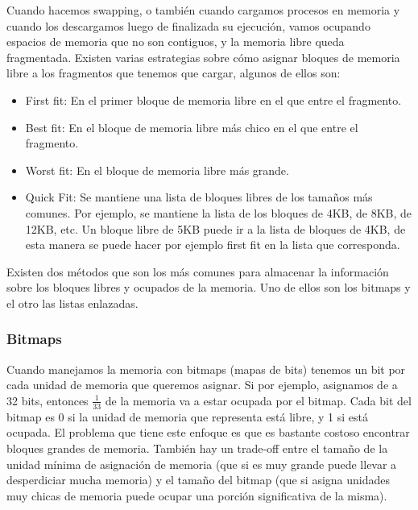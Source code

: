 \documentclass{article}
\begin{document}
Cuando hacemos swapping, o tambi\'en cuando cargamos procesos en memoria y cuando los descargamos luego de finalizada su ejecuci\'on, vamos ocupando espacios de memoria que no son contiguos, y la memoria libre queda fragmentada. Existen varias estrategias sobre c\'omo asignar bloques de memoria libre a los fragmentos que tenemos que cargar, algunos de ellos son:

\begin{itemize}
\item First fit: En el primer bloque de memoria libre en el que entre el fragmento.
\item Best fit: En el bloque de memoria libre m\'as chico en el que entre el fragmento.
\item Worst fit: En el bloque de memoria libre m\'as grande.
\item Quick Fit: Se mantiene una lista de bloques libres de los tama\~nos m\'as comunes. Por ejemplo, se mantiene la lista de los bloques de 4KB, de 8KB, de 12KB, etc. Un bloque libre de 5KB puede ir a la lista de bloques de 4KB, de esta manera se puede hacer por ejemplo first fit en la lista que corresponda.
\end{itemize}

Existen dos m\'etodos que son los m\'as comunes para almacenar la informaci\'on sobre los bloques libres y ocupados de la memoria. Uno de ellos son los bitmaps y el otro las listas enlazadas.

\subsubsection{Bitmaps}
Cuando manejamos la memoria con bitmaps (mapas de bits) tenemos un bit por cada unidad de memoria que queremos asignar. Si por ejemplo, asignamos de a 32 bits, entonces $\frac{1}{33}$ de la memoria va a estar ocupada por el bitmap. Cada bit del bitmap es 0 si la unidad de memoria que representa est\'a libre, y 1 si est\'a ocupada. El problema que tiene este enfoque es que es bastante costoso encontrar bloques grandes de memoria. Tambi\'en hay un trade-off entre el tama\~no de la unidad m\'inima de asignaci\'on de memoria (que si es muy grande puede llevar a desperdiciar mucha memoria) y el tama\~no del bitmap (que si asigna unidades muy chicas de memoria puede ocupar una porci\'on significativa de la misma).
 
\end{document}
